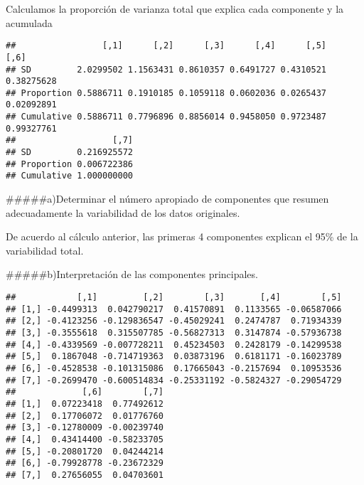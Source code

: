 \documentclass[]{article}
\newenvironment{Shaded}{\begin{snugshade}}{\end{snugshade}}
\newcommand{\DataTypeTok}[1]{\textcolor[rgb]{0.13,0.29,0.53}{#1}}
\newcommand{\KeywordTok}[1]{\textcolor[rgb]{0.13,0.29,0.53}{\textbf{#1}}}
\newcommand{\NormalTok}[1]{#1}
\newcommand{\OperatorTok}[1]{\textcolor[rgb]{0.81,0.36,0.00}{\textbf{#1}}}
\begin{document}
Calculamos la proporción de varianza total que explica cada componente y
la acumulada

\begin{Shaded}
\end{Shaded}

\begin{verbatim}
##                 [,1]      [,2]      [,3]      [,4]      [,5]       [,6]
## SD         2.0299502 1.1563431 0.8610357 0.6491727 0.4310521 0.38275628
## Proportion 0.5886711 0.1910185 0.1059118 0.0602036 0.0265437 0.02092891
## Cumulative 0.5886711 0.7796896 0.8856014 0.9458050 0.9723487 0.99327761
##                   [,7]
## SD         0.216925572
## Proportion 0.006722386
## Cumulative 1.000000000
\end{verbatim}

\#\#\#\#\#a)Determinar el número apropiado de componentes que resumen
adecuadamente la variabilidad de los datos originales.

De acuerdo al cálculo anterior, las primeras 4 componentes explican el
95\% de la variabilidad total.

\#\#\#\#\#b)Interpretación de las componentes principales.

\begin{Shaded}
\end{Shaded}

\begin{verbatim}
##            [,1]         [,2]        [,3]       [,4]        [,5]
## [1,] -0.4499313  0.042790217  0.41570891  0.1133565 -0.06587066
## [2,] -0.4123256 -0.129836547 -0.45029241  0.2474787  0.71934339
## [3,] -0.3555618  0.315507785 -0.56827313  0.3147874 -0.57936738
## [4,] -0.4339569 -0.007728211  0.45234503  0.2428179 -0.14299538
## [5,]  0.1867048 -0.714719363  0.03873196  0.6181171 -0.16023789
## [6,] -0.4528538 -0.101315086  0.17665043 -0.2157694  0.10953536
## [7,] -0.2699470 -0.600514834 -0.25331192 -0.5824327 -0.29054729
##             [,6]        [,7]
## [1,]  0.07223418  0.77492612
## [2,]  0.17706072  0.01776760
## [3,] -0.12780009 -0.00239740
## [4,]  0.43414400 -0.58233705
## [5,] -0.20801720  0.04244214
## [6,] -0.79928778 -0.23672329
## [7,]  0.27656055  0.04703601
\end{verbatim}
\end{document}
